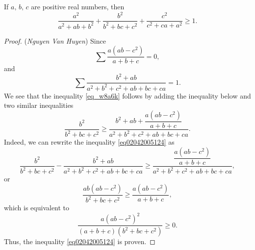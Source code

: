 \documentclass[12pt,a4paper]{book}
\begin{document}
\begin{pro_no_count}
If $a,\,b,\,c$ are positive real numbers, then
\begin{equation}\label{eq_w8a6k}
\frac{a^2}{a^2+ab+b^2} + \frac{b^2}{b^2+bc+c^2} + \frac{c^2}{c^2+ca+a^2} \ge 1.
\end{equation} 
\end{pro_no_count}

\begin{proof}
(\textit{Nguyen Van Huyen}) Since
\[\sum \dfrac{a(ab-c^2)}{a+b+c} = 0,\]
and
\[\sum \frac{b^2+ab}{a^2+b^2+c^2+ab+bc+ca} = 1.\]
We see that the inequality \eqref{eq_w8a6k} follows by adding the inequality below and two similar inequalities
\begin{equation}\label{eq02042005124}
\frac{b^2}{b^2+bc+c^2} \ge \frac{b^2+ab+\dfrac{a(ab-c^2)}{a+b+c}}{a^2+b^2+c^2+ab+bc+ca}.
\end{equation}
Indeed, we can rewrite the inequality \eqref{eq02042005124} as
\[\frac{b^2}{b^2+bc+c^2} -  \frac{b^2+ab}{a^2+b^2+c^2+ab+bc+ca} \ge \frac{\dfrac{a(ab-c^2)}{a+b+c}}{a^2+b^2+c^2+ab+bc+ca},\]
or
\[\frac{ab(ab-c^2)}{b^2+bc+c^2} \ge \frac{a(ab-c^2)}{a+b+c},\]
which is equivalent to
\[\frac{a(ab-c^2)^2}{(a+b+c)(b^2+bc+c^2)} \ge 0.\]
Thus, the inequality \eqref{eq02042005124} is proven.
%
\end{proof}
\end{document}
